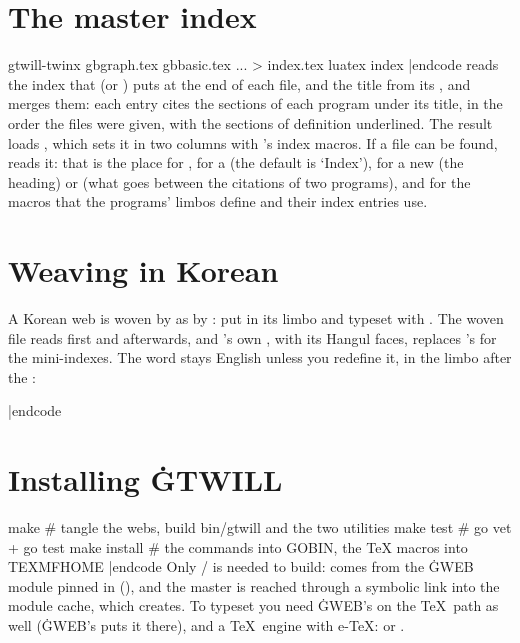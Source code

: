 \chapter{The master index}
\begincode
gtwill-twinx gbgraph.tex gbbasic.tex ... > index.tex
luatex index
|endcode
 reads the index that  (or ) puts at the end
of each  file, and the title from its ,
and merges them: each entry cites the sections of each program under its title,
in the order the files were given, with the sections of definition underlined.
The result loads , which sets it in two columns with
's index macros. If a file  can be found,
 reads it: that is the place for , for a
 (the default is `Index'), for a new  (the
heading) or  (what goes between the citations of two programs),
and for the macros that the programs' limbos define and their index entries use.

\chapter{Weaving in Korean}
\noindent A Korean web is woven by  as by : put
 in its limbo and typeset with . The woven file
reads  first and  afterwards, and
's own , with its Hangul faces, replaces
's for the mini-indexes. The word  stays
English unless you redefine it, in the limbo after the :
\begincode

\def\twilllabel{레이블}
|endcode

\chapter{Installing \.{GTWILL}}
\begincode
make            # tangle the webs, build bin/gtwill and the two utilities
make test       # go vet + go test
make install    # the commands into GOBIN, the TeX macros into TEXMFHOME
|endcode
Only \GO/ is needed to build:  comes from the \.{GWEB} module pinned in
 (), and the master  is reached through
a symbolic link  into the module cache, which  creates. To
typeset you need \.{GWEB}'s  on the \TeX\ path as well
(\.{GWEB}'s  puts it there), and a \TeX\ engine with e-\TeX:
 or .

